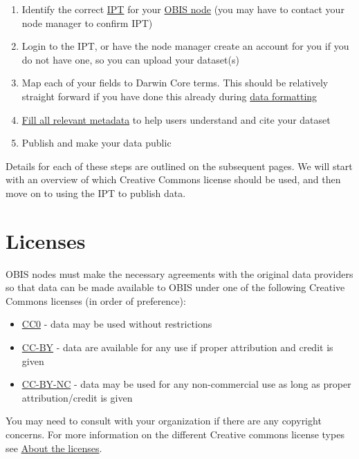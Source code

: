 \documentclass[
  letterpaper,
  DIV=11,
  numbers=noendperiod,
  oneside]{scrreprt}
\providecommand{\tightlist}{%
  \setlength{\itemsep}{0pt}\setlength{\parskip}{0pt}}\usepackage{longtable,booktabs,array}
\begin{document}
\begin{enumerate}
\def\labelenumi{\arabic{enumi}.}
\tightlist
\item
  Identify the correct \href{https://ipt.iobis.org/}{IPT} for your
  \href{https://obis.org/contact/}{OBIS node} (you may have to contact
  your node manager to confirm IPT)
\item
  Login to the IPT, or have the node manager create an account for you
  if you do not have one, so you can upload your dataset(s)
\item
  Map each of your fields to Darwin Core terms. This should be
  relatively straight forward if you have done this already during
  \href{formatting.html}{data formatting}
\item
  \href{eml.html}{Fill all relevant metadata} to help users understand
  and cite your dataset
\item
  Publish and make your data public
\end{enumerate}

Details for each of these steps are outlined on the subsequent pages. We
will start with an overview of which Creative Commons license should be
used, and then move on to using the IPT to publish data.

\hypertarget{licenses}{%
\section{Licenses}\label{licenses}}

OBIS nodes must make the necessary agreements with the original data
providers so that data can be made available to OBIS under one of the
following Creative Commons licenses (in order of preference):

\begin{itemize}
\tightlist
\item
  \href{https://creativecommons.org/publicdomain/zero/1.0/}{CC0} - data
  may be used without restrictions
\item
  \href{https://creativecommons.org/licenses/by/4.0/}{CC-BY} - data are
  available for any use if proper attribution and credit is given
\item
  \href{https://creativecommons.org/licenses/by-nc/4.0/}{CC-BY-NC} -
  data may be used for any non-commercial use as long as proper
  attribution/credit is given
\end{itemize}

You may need to consult with your organization if there are any
copyright concerns. For more information on the different Creative
commons license types see
\href{https://creativecommons.org/licenses/}{About the licenses}.
\end{document}
